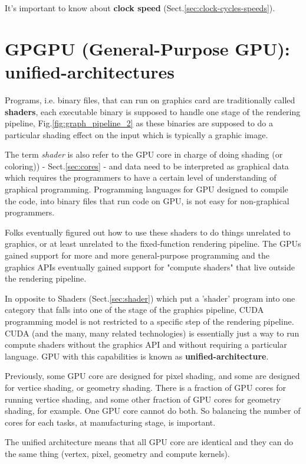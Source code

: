 It's important to know about {\bf clock speed}
(Sect.\ref{sec:clock-cycles-speeds}). 


\section{GPGPU (General-Purpose GPU): unified-architectures}
\label{sec:gpu-unified-architecture}

Programs, i.e. binary files, that can run on graphics card are traditionally
called {\bf shaders}, each executable binary is supposed to handle one stage of
the rendering pipeline, Fig.\ref{fig:graph_pipeline_2} as these binaries are
supposed to do a particular shading effect on the input which is typically a
graphic image.

The term {\it shader} is also refer to the GPU core in charge of doing shading
(or coloring)) - Sect.\ref{sec:cores} - and data need to be interpreted as
graphical data which requires the programmers to have a certain level of
understanding of graphical programming. Programming languages for GPU designed
to compile the code, into binary files that run code on GPU, is not easy for
non-graphical programmers.

Folks eventually figured out how to use these shaders to do things unrelated to
graphics, or at least unrelated to the fixed-function rendering pipeline. The
GPUs gained support for more and more general-purpose programming and the
graphics APIs eventually gained support for "compute shaders" that live outside
the rendering pipeline.

In opposite to Shaders (Sect.\ref{sec:shader}) which put a 'shader' program into
one category that falls into one of the stage of the graphics pipeline, CUDA
programming model is not restricted to a specific step of the rendering
pipeline. CUDA (and the many, many related technologies) is essentially just a
way to run compute shaders without the graphics API and without requiring a
particular language. GPU with this capabilities is known as {\bf unified-architecture}.

\begin{mdframed}

Previously, some GPU core are designed for pixel shading, and some are designed
for vertice shading, or geometry shading.  There is a fraction of GPU cores for
running vertice shading, and some other fraction of GPU cores for geometry
shading, for example. One GPU core cannot do both. So balancing the number of
cores for each tasks, at manufacturing stage, is important.

The unified architecture means that all GPU core are identical and they can do
the same thing (vertex, pixel, geometry and compute kernels).

\end{mdframed}

